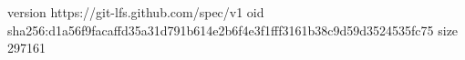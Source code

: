 version https://git-lfs.github.com/spec/v1
oid sha256:d1a56f9facaffd35a31d791b614e2b6f4e3f1fff3161b38c9d59d3524535fc75
size 297161
